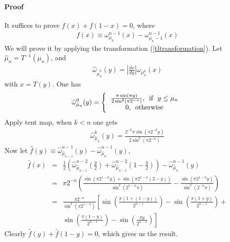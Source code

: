 \documentclass{article}
\begin{document}
\paragraph{Proof}
It suffices to prove $f(x)+ f(1-x) = 0$, where 
  \begin{eqnarray}
     f(x) \equiv \omega_{\mu_n}^{n-1}(x) -\omega_{\mu_n-1}^{n-1}(x)
  \end{eqnarray}
We will prove it by applying the transformation (\ref{tltransformation}). Let $\hat{\mu}_n = T^{-1}(\mu_n)$, and 
 \begin{eqnarray}
    \hat{\omega}_{\hat{\mu}_n^0}(y) = \left|\frac{dx}{dy}\right| \omega_{\mu_n^0}(x)   
 \end{eqnarray}
with $x = T(y)$. One has
 \begin{eqnarray}
 \label{omegamunbar0}
    \hat{\omega}_{\hat{\mu}_n}^0(y) = \left\{ \begin{tabular}{c}
                      $\frac{\pi \sin(\pi y)}{2 \sin^2(\pi 2^{-n})} $, \mbox{  if  } $y \le \mu_n$ \nonumber\\ 
                      $0$, \mbox{  otherwise} 
                      \end{tabular}\right.
  \end{eqnarray}
Apply tent map, when $k<n$ one gets
 \begin{eqnarray}
   \hat{\omega}_{\hat{\mu}_n}^k(y)  = \frac{ 2^{-k} \pi \sin(\pi 2^{-k}y)}{2 \sin^2(\pi 2^{-n})}
 \end{eqnarray}
Now let $\hat{f}(y) \equiv \hat{\omega}_{\hat{\mu}_{n-1}}^{n-1}(y) -\hat{\omega}_{\hat{\mu}_n}^{n-1}(y)$,
 \begin{eqnarray}
  \hat{f}(x)  &=&  \frac{1}{2} \left(  \hat{\omega}_{\hat{\mu}_{n-1}}^{n-2}\left(\frac{y}{2}\right) +
                                     \hat{\omega}_{\hat{\mu}_{n-1}}^{n-2}\left(1-\frac{y}{2}\right)  \right) 
                                    -\hat{\omega}_{\hat{\mu}_n}^{n-1}(y) \nonumber\\
              &=& \pi 2^{-n} \left( \frac{\sin(\pi 2^{1-n}y)+\sin(\pi 2^{1-n}(2-y))}{\sin^2(2^{1-n}\pi)} 
                                    -\frac{\sin(\pi 2^{1-n}y)}{\sin^2(2^{-n}\pi)}
                                     \right) \nonumber\\
              &=& \frac{\pi 2^{-n}}{\sin^2(\pi 2^{1-n})} \left[ 
                                     \sin \left(\frac{\pi(1+(1-y))}{2^{n-1}}\right)  
                                    -\sin \left(\frac{\pi(1+y)}{2^{n-1}} \right) + \right. \nonumber\\
              & &             \left. \sin \left(\frac{\pi(1-y)}{2^{n-1}}\right) 
                                    -\sin \left(\frac{\pi y }{2^{n-1}}\right)
                                                          \right]
 \end{eqnarray}
Clearly $\hat{f}(y) + \hat{f}(1-y) = 0$, which gives us the result.
\end{document}
